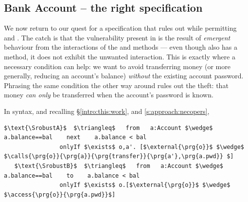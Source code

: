  \subsection{Bank Account -- the right specification}
\label{s:bankSpecEx}

We now {return to our quest for} a specification that rules out \ModB while permitting \ModA and
\ModC. The catch is that the vulnerability present in \ModB is the result
of  \emph{emergent} behaviour from the interactions of the 
and  methods --- even though \ModC also has a
 method, it does not exhibit the unwanted interaction.
This is exactly where a necessary condition can help:
we want to avoid transferring money
(or more generally, reducing an account's balance)
\textit{without} the existing account password.  Phrasing the same condition
the other way around %
rules out the theft: that money \textit{can only} be
transferred when the account's password is known.


In \Nec  syntax, and {recalling \S \ref{intro:this:work}, and \ref{s:approach:necopers},}
 

%
%
%
%
%
%
\begin{lstlisting}[language = Chainmail, mathescape=true, frame=lines]
   $\text{\SrobustA}$  $\triangleq$   from   a:Account $\wedge$ a.balance==bal    next    a.balance < bal
                onlyIf $\exists$ o,a'. [$\external{\prg{o}}$ $\wedge$ $\calls{\prg{o}}{\prg{a}}{\prg{transfer}}{\prg{a'},\prg{a.pwd}} $]                   
   $\text{\SrobustB}$  $\triangleq$   from   a:Account $\wedge$ a.balance==bal    to    a.balance < bal
                onlyIf $\exists$ o.[$\external{\prg{o}}$ $\wedge$ $\access{\prg{o}}{\prg{a.pwd}}$]    
           
\end{lstlisting}
%
%
% 

